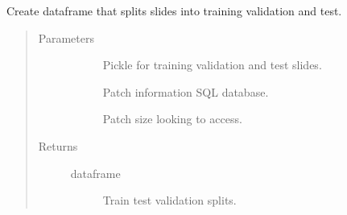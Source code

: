 \documentclass[letterpaper,10pt,english]{sphinxmanual}
\begin{document}
\begin{fulllineitems}
\label{\detokenize{index:pathflowai.utils.create_train_val_test}}
Create dataframe that splits slides into training validation and test.
\begin{quote}\begin{description}
\item[{Parameters}] \leavevmode\begin{description}
\item[{}] \leavevmode
Pickle for training validation and test slides.

\item[{}] \leavevmode
Patch information SQL database.

\item[{}] \leavevmode
Patch size looking to access.

\end{description}

\item[{Returns}] \leavevmode\begin{description}
\item[{dataframe}] \leavevmode
Train test validation splits.

\end{description}

\end{description}\end{quote}

\end{fulllineitems}

\end{document}
